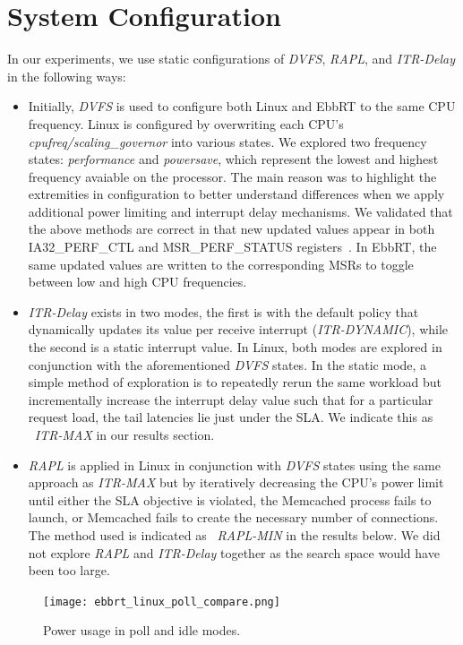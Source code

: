 \documentclass[letterpaper,twocolumn,10pt]{article}
\begin{document}
\section{System Configuration}
In our experiments, we use static configurations of \textit{DVFS}, \textit{RAPL}, and \textit{ITR-Delay} in the following ways:
\begin{itemize}
\item Initially, \textit{DVFS} is used to configure both Linux and EbbRT to the same CPU frequency.
Linux is configured by overwriting each CPU's \textit{cpufreq/scaling\_governor} into various states.
We explored two frequency states: \textit{performance} and \textit{powersave}, which represent the lowest and highest frequency avaiable on the processor.
The main reason was to highlight the extremities in configuration to better understand differences when we apply additional power limiting and interrupt delay mechanisms.
We validated that the above methods are correct in that new updated values appear in both IA32\_PERF\_CTL and MSR\_PERF\_STATUS registers~\cite{intel_msr}.
In EbbRT, the same updated values are written to the corresponding MSRs to toggle between low and high CPU frequencies.
\item \textit{ITR-Delay} exists in two modes, the first is with the default policy that dynamically updates its value per receive interrupt (\textit{ITR-DYNAMIC}), while the second is a static interrupt value.
In Linux, both modes are explored in conjunction with the aforementioned \textit{DVFS} states.
In the static mode, a simple method of exploration is to repeatedly rerun the same workload but incrementally increase the interrupt delay value such that for a particular request load, the tail latencies lie just under the SLA.
We indicate this as ~\textit{ITR-MAX} in our results section.
\item \textit{RAPL} is applied in Linux in conjunction with \textit{DVFS} states using the same approach as \textit{ITR-MAX} but by iteratively decreasing the CPU's power limit until either the SLA objective is violated, the Memcached process fails to launch, or Memcached fails to create the necessary number of connections. The method used is indicated as ~\textit{RAPL-MIN} in the results below.
We did not explore \textit{RAPL} and \textit{ITR-Delay} together as the search space would have been too large.
\end{itemize}

\begin{figure}
  \texttt{[image: ebbrt\_linux\_poll\_compare.png]}
  \caption{Power usage in poll and idle modes.}
  \label{fig:ebbrt_linux_poll}  
\end{figure}
\end{document}
